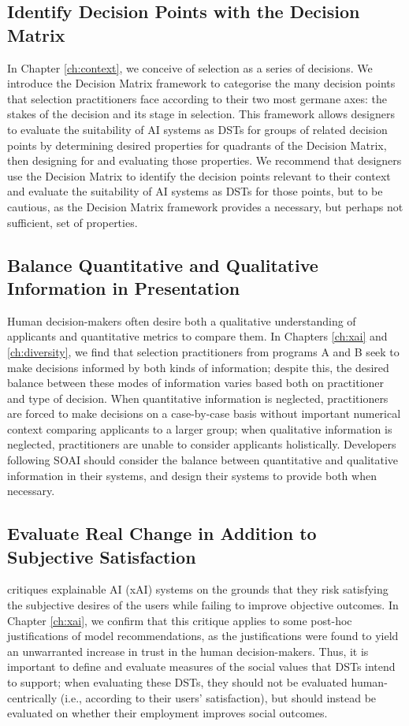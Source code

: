 \subsection{Identify Decision Points with the Decision Matrix}
In Chapter \ref{ch:context}, we conceive of selection as a series of decisions. We introduce the Decision Matrix framework to categorise the many decision points that selection practitioners face according to their two most germane axes: the stakes of the decision and its stage in selection. This framework allows designers to evaluate the suitability of AI systems as DSTs for groups of related decision points by determining desired properties for quadrants of the Decision Matrix, then designing for and evaluating those properties. We recommend that designers use the Decision Matrix to identify the decision points relevant to their context and evaluate the suitability of AI systems as DSTs for those points, but to be cautious, as the Decision Matrix framework provides a necessary, but perhaps not sufficient, set of properties. 

\subsection{Balance Quantitative and Qualitative Information in Presentation}
Human decision-makers often desire both a qualitative understanding of applicants and quantitative metrics to compare them. In Chapters \ref{ch:xai} and \ref{ch:diversity}, we find that selection practitioners from programs A and B seek to make decisions informed by both kinds of information; despite this, the desired balance between these modes of information varies based both on practitioner and type of decision. When quantitative information is neglected, practitioners are forced to make decisions on a case-by-case basis without important numerical context comparing applicants to a larger group; when qualitative information is neglected, practitioners are unable to consider applicants holistically. Developers following SOAI should consider the balance between quantitative and qualitative information in their systems, and design their systems to provide both when necessary.

\subsection{Evaluate Real Change in Addition to Subjective Satisfaction}
\textcite{Lipton} critiques explainable AI (xAI) systems on the grounds that they risk satisfying the subjective desires of the users while failing to improve objective outcomes. In Chapter \ref{ch:xai}, we confirm that this critique applies to some post-hoc justifications of model recommendations, as the justifications were found to yield an unwarranted increase in trust in the human decision-makers. Thus, it is important to define and evaluate measures of the social values that DSTs intend to support; when evaluating these DSTs, they should not be evaluated human-centrically (i.e., according to their users' satisfaction), but should instead be evaluated on whether their employment improves social outcomes.

